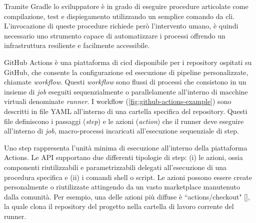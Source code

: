 Tramite Gradle lo sviluppatore è in grado di eseguire procedure articolate come compilazione, test e dispiegamento utilizzando un semplice comando da \ac{cli}. L'invocazione di queste procedure richiede però l'intervento umano, è quindi necessario uno strumento capace di automatizzare i processi offrendo un infrastruttura resiliente e facilmente accessibile.

GitHub Actions è una piattaforma di \ac{cicd} disponibile per i repository ospitati su GitHub, che consente la configurazione ed esecuzione di pipeline personalizzate, chiamate \textit{workflow}. Questi \textit{workflow} sono flussi di processi che consistono in un insieme di \textit{job} eseguiti sequenzialmente o parallelamente all'interno di macchine virtuali denominate \textit{runner}. I workflow (\cref{fig:github-actions-example}) sono descritti in file YAML all'interno di una cartella specifica del repository. Questi file definiscono i passaggi (\textit{step}) e le azioni (\textit{action}) che il runner deve eseguire all'interno di \textit{job}, macro-processi incaricati all'esecuzione sequenziale di step.


Uno step rappresenta l'unità minima di esecuzione all'interno della piattaforma Actions. Le API supportano due differenti tipologie di step: (i) le azioni, ossia componenti riutilizzabili e parametrizzabili delegati all'esecuzione di una procedura specifica e (ii) i comandi shell o script. Le azioni possono essere create personalmente o riutilizzate attingendo da un vasto marketplace manutenuto dalla comunità. Per esempio, una delle azioni più diffuse è ``actions/checkout" [\cite{github-actions-diffusion}], la quale clona il repository del progetto nella cartella di lavoro corrente del runner.
